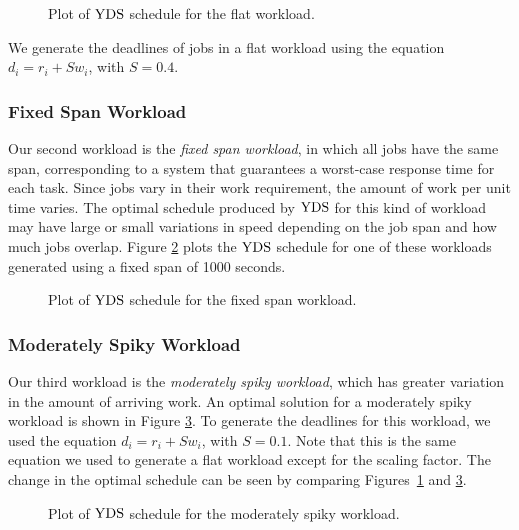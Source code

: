 \documentclass[11pt]{article}
\newcommand{\YDS}{{\rm YDS}}
\begin{document}
\begin{figure}
\centering
{}
\caption{Plot of $\YDS$ schedule for the flat workload.}
\label{fig:YDS_Flat}
\end{figure}

We generate the deadlines of jobs in a flat workload using the equation
$d_i = r_i + Sw_i$, with $S = 0.4$.

\subsubsection{Fixed Span Workload}
Our second workload is the {\em fixed span workload}, in which all jobs
have the same span, corresponding to a system that guarantees a
worst-case response time for each task.
Since jobs vary in their work requirement, the amount of work per unit
time varies.
The optimal schedule produced by $\YDS$ for this kind of workload may
have large or small variations in speed depending on the job span
and how much jobs overlap.
Figure \ref{fig:YDS_Fixed} plots the $\YDS$ schedule for
one of these workloads generated using a fixed span of 1000 seconds.

\begin{figure}
\centering
{}
\caption{Plot of $\YDS$ schedule for the fixed span workload.}
\label{fig:YDS_Fixed}
\end{figure}

\subsubsection{Moderately Spiky Workload}

Our third workload is the {\em moderately spiky workload}, which has
greater variation in the amount of arriving work.
An optimal solution for a moderately spiky workload is shown in 
Figure \ref{fig:YDS_Moderate}.
To generate the deadlines for this workload, we used the equation
$d_i = r_i + Sw_i$, with $S = 0.1$.
Note that this is the same equation we used to generate a flat
workload except for the scaling factor.
The change in the optimal schedule can be seen by comparing
Figures~\ref{fig:YDS_Flat} and \ref{fig:YDS_Moderate}.

\begin{figure}
\centering
{}
\caption{Plot of $\YDS$ schedule for the moderately spiky workload.}
\label{fig:YDS_Moderate}
\end{figure} 
\end{document}

